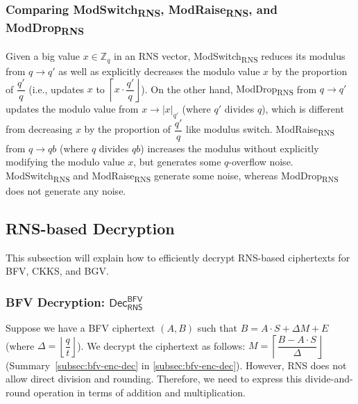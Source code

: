 \subsubsection{Comparing \textsf{ModSwitch\textsubscript{RNS}}, \textsf{ModRaise\textsubscript{RNS}}, and \textsf{ModDrop\textsubscript{RNS}}}

Given a big value $x \in \mathbb{Z}_q$ in an RNS vector, \textsf{ModSwitch\textsubscript{RNS}} reduces its modulus from $q \rightarrow  q'$ as well as explicitly decreases the modulo value $x$ by the proportion of $\dfrac{q'}{q}$ (i.e., updates $x$ to $ \left\lceil x \cdot \dfrac{q'}{q}\right\rfloor$). On the other hand, \textsf{ModDrop\textsubscript{RNS}} from $q \rightarrow q'$ updates the modulo value from $x \rightarrow |x|_{q'}$ (where $q'$ divides $q$), which is different from decreasing $x$ by the proportion of $\dfrac{q'}{q}$ like modulus switch. \textsf{ModRaise\textsubscript{RNS}} from $q \rightarrow qb$ (where $q$ divides $qb$) increases the modulus without explicitly modifying the modulo value $x$, but generates some $q$-overflow noise. \textsf{ModSwitch\textsubscript{RNS}} and \textsf{ModRaise\textsubscript{RNS}} generate some noise, whereas \textsf{ModDrop\textsubscript{RNS}} does not generate any noise. %




\subsection{RNS-based Decryption}
\label{subsec:rns-dec}

This subsection will explain how to efficiently decrypt RNS-based ciphertexts for BFV, CKKS, and BGV. 


\subsubsection{BFV Decryption: $\textsf{Dec}_{\textsf{RNS}}^{\textsf{BFV}}$}
\label{subsubsec:rns-dec-bfv}

Suppose we have a BFV ciphertext $(A, B)$ such that $B = A\cdot S + \Delta M + E$ (where $\Delta = \left\lfloor\dfrac{q}{t}\right\rfloor$). We decrypt the ciphertext as follows: $M = \left\lceil\dfrac{B - A\cdot S}{\Delta}\right\rfloor$ (Summary~\ref*{subsec:bfv-enc-dec} in \autoref{subsec:bfv-enc-dec}). However, RNS does not allow direct division and rounding. Therefore, we need to express this divide-and-round operation in terms of addition and multiplication.

